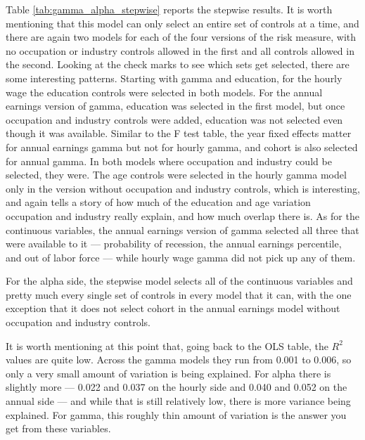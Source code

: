 \documentclass[12pt]{article}
\begin{document}
\begin{onehalfspace}
Table \ref{tab:gamma_alpha_stepwise} reports the stepwise results. It is worth mentioning that this model can only select an entire set of controls at a time, and there are again two models for each of the four versions of the risk measure, with no occupation or industry controls allowed in the first and all controls allowed in the second. Looking at the check marks to see which sets get selected, there are some interesting patterns. Starting with gamma and education, for the hourly wage the education controls were selected in both models. For the annual earnings version of gamma, education was selected in the first model, but once occupation and industry controls were added, education was not selected even though it was available. Similar to the F test table, the year fixed effects matter for annual earnings gamma but not for hourly gamma, and cohort is also selected for annual gamma. In both models where occupation and industry could be selected, they were. The age controls were selected in the hourly gamma model only in the version without occupation and industry controls, which is interesting, and again tells a story of how much of the education and age variation occupation and industry really explain, and how much overlap there is. As for the continuous variables, the annual earnings version of gamma selected all three that were available to it --- probability of recession, the annual earnings percentile, and out of labor force --- while hourly wage gamma did not pick up any of them.

\begin{table}[H]
    \centering
    \caption{Gamma and Alpha Regressions: Stepwise Selection Results (Coefficients x 100)}
    \label{tab:gamma_alpha_stepwise}
    \resizebox{\textwidth}{!}{%
        
    }
\end{table}


For the alpha side, the stepwise model selects all of the continuous variables and pretty much every single set of controls in every model that it can, with the one exception that it does not select cohort in the annual earnings model without occupation and industry controls.

It is worth mentioning at this point that, going back to the OLS table, the $R^2$ values are quite low. Across the gamma models they run from 0.001 to 0.006, so only a very small amount of variation is being explained. For alpha there is slightly more --- 0.022 and 0.037 on the hourly side and 0.040 and 0.052 on the annual side --- and while that is still relatively low, there is more variance being explained. For gamma, this roughly thin amount of variation is the answer you get from these variables.


\end{onehalfspace}
\end{document}
